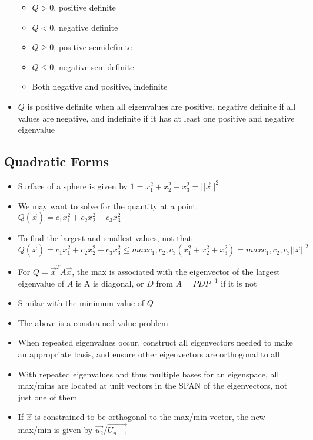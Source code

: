 \documentclass{article}
\begin{document}
\begin{itemize}
    \begin{itemize}
        \item \(Q>0\), positive definite
        \item \(Q<0\), negative definite 
        \item \(Q\geq0\), positive semidefinite
        \item \(Q\leq0\), negative semidefinite
        \item Both negative and positive, indefinite 
    \end{itemize}
    \item \(Q\) is positive definite when all eigenvalues are positive, negative definite if all values are negative, and indefinite if it has at least one positive and negative eigenvalue 
\end{itemize}

\subsection{Quadratic Forms}
\begin{itemize}
    \item Surface of a sphere is given by \(1=x_1^2+x_2^2+x_3^2=||\vec{x}||^2\)
    \item We may want to solve for the quantity at a point \(Q(\vec{x})=c_1x_1^2+c_2x_2^2+c_3x_3^2\)
    \item To find the largest and smallest values, not that 
    \[Q(\vec{x})=c_1x_1^2+c_2x_2^2+c_3x_3^2\leq max{c_1,c_2,c_3}(x_1^2+x_2^2+x_3^2)=max{c_1,c_2,c_3}||\vec{x}||^2\]
    \item For \(Q=\vec{x}^TA\vec{x}\), the max is associated with the eigenvector of the largest eigenvalue of \(A\) is A is diagonal, or \(D\) from \(A=PDP^{-1}\) if it is not 
    \item Similar with the minimum value of \(Q\)
    \item The above is a constrained value problem 
    \item When repeated eigenvalues occur, construct all eigenvectors needed to make an appropriate basis, and ensure other eigenvectors are orthogonal to all 
    \item With repeated eigenvalues and thus multiple bases for an eigenspace, all max/mins are located at unit vectors in the SPAN of the eigenvectors, not just one of them 
    \item If \(\vec{x}\) is constrained to be orthogonal to the max/min vector, the new max/min is given by \(\vec{u_2}/\vec{U_{n-1}}\)
\end{itemize}
\end{document}
